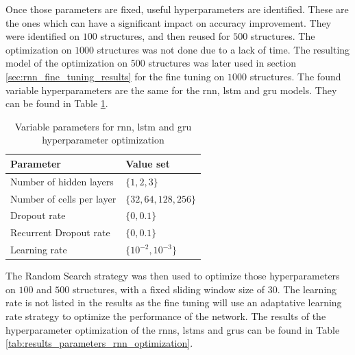 \documentclass[conference]{IEEEtran}
\begin{document}
Once those parameters are fixed, useful hyperparameters are identified. These are the ones which can have a significant impact on accuracy improvement. They were identified on $ 100 $ structures, and then reused for $ 500 $ structures. The optimization on $ 1000 $ structures was not done due to a lack of time. The resulting model of the optimization on $ 500 $ structures was later used in section \ref{sec:rnn_fine_tuning_results} for the fine tuning on $ 1000 $ structures. The found variable hyperparameters are the same for the \gls{rnn}, \gls{lstm} and \gls{gru} models. They can be found in Table \ref{tab:variable_parameters_rnn_optimization}.

\begin{table}[htp]
	\centering
	\caption{Variable parameters for \gls{rnn}, \gls{lstm} and \gls{gru} hyperparameter optimization}
	\label{tab:variable_parameters_rnn_optimization}
	\begin{tabular}{ll}
		\textbf{Parameter} & \textbf{Value set} \\
		\hline
		Number of hidden layers & $ \{1, 2, 3\} $ \\
		Number of cells per layer & $ \{32, 64, 128, 256\} $ \\
		Dropout rate & $ \{0, 0.1\} $ \\
		Recurrent Dropout rate & $ \{0, 0.1\} $ \\
		Learning rate & $ \{10^{-2}, 10^{-3}\} $
	\end{tabular}
\end{table}

The Random Search strategy was then used to optimize those hyperparameters on $ 100 $ and $ 500 $ structures, with a fixed sliding window size of $ 30 $. The learning rate is not listed in the results as the fine tuning will use an adaptative learning rate strategy to optimize the performance of the network. The results of the hyperparameter optimization of the \glspl{rnn}, \glspl{lstm} and \glspl{gru} can be found in Table \ref{tab:results_parameters_rnn_optimization}.
\end{document}
